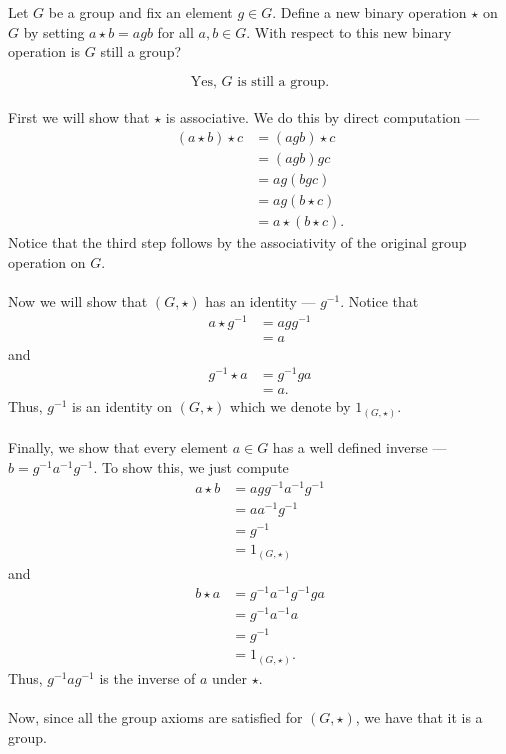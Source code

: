 \documentclass[12 pt, letterpaper]{hmcpset}
\begin{document}
\pagebreak

\begin{problem}[2.]
	Let $G$ be a group and fix an element $g \in G$. Define a new binary operation $\star$ on $G$ by setting $a \star b = agb$ for all $a, b \in G$. With respect to this new binary operation is $G$ still a group?
\end{problem}

\begin{solution}
	\[
		\boxed{
			\text{Yes, } G \text{ is still a group.}
		}
	\] \\
	First we will show that $\star$ is associative. We do this by direct computation ---
	\[
		\begin{split}
			(a \star b) \star c & = (agb) \star c \\
					    & = (agb)gc \\
					    & = ag(bgc) \\
					    & = ag(b \star c) \\
					    & = a \star (b \star c).
		\end{split}
	\]
	Notice that the third step follows by the associativity of the original group operation on $G$. \\\\
	Now we will show that $(G, \star)$ has an identity --- $g^{-1}$. Notice that
	\[
		\begin{split}
			a \star g^{-1} & = a g g^{-1} \\
				       & = a
		\end{split}
	\]
	and
	 \[
		\begin{split}
			g^{-1} \star a & = g^{-1} g a \\
				       & = a.
		\end{split}
	\]
	Thus, $g^{-1}$ is an identity on $(G, \star)$ which we denote by $1_{(G, \star)}$. \\\\
	Finally, we show that every element $a \in G$ has a well defined inverse --- $b = g^{-1} a^{-1} g^{-1}$. To show this, we just compute
	\[
		\begin{split}
			a \star b & = a g g^{-1} a^{-1} g^{-1} \\
				  & = a a^{-1} g^{-1} \\
				  & = g^{-1} \\
				  & = 1_{(G, \star)}
		\end{split}
	\]
	and
	\[
		\begin{split}
			b \star a & = g^{-1} a^{-1} g^{-1} g a \\
				  & = g^{-1} a^{-1} a \\
				  & = g^{-1} \\
				  & = 1_{(G, \star)}.
		\end{split}
	\]
	Thus, $g^{-1} a g^{-1}$ is the inverse of $a$ under $\star$. \\\\
	Now, since all the group axioms are satisfied for $(G, \star)$, we have that it is a group.
\end{solution}
\end{document}
